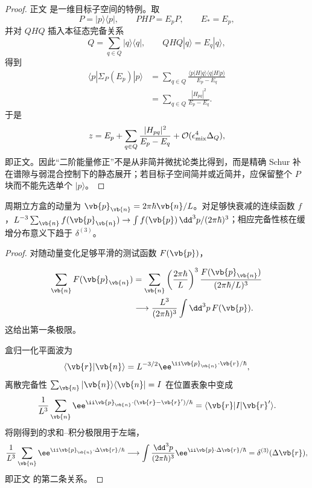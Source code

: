 \begin{proof}
正文 是一维目标子空间的特例。取
\[
P=|p\rangle\langle p|,
\qquad
PHP=E_pP,
\qquad
E_*=E_p,
\]
并对 \(QHQ\) 插入本征态完备关系
\[
Q
=
\sum_{q\in Q}|q\rangle\langle q|,
\qquad
QHQ|q\rangle=E_q|q\rangle,
\]
得到
\begin{align*}
\langle p|\Sigma_P(E_p)|p\rangle
&=
\sum_{q\in Q}
\frac{
\langle p|H|q\rangle
\langle q|H|p\rangle
}{E_p-E_q}\\
&=
\sum_{q\in Q}
\frac{|H_{pq}|^2}{E_p-E_q}.
\end{align*}
于是
\[
z
=
E_p
+
\sum_{q\in Q}
\frac{|H_{pq}|^2}{E_p-E_q}
+
\mathcal O(\epsilon_{\rm mix}^4\Delta_Q),
\]
即正文。因此“二阶能量修正”不是从非简并微扰论类比得到，而是精确 Schur 补在谱隙与弱混合控制下的静态展开；若目标子空间简并或近简并，应保留整个 \(P\) 块而不能先选单个 \(|p\rangle\)。
\end{proof}

\begin{proposition}[盒归一化的连续谱极限]
周期立方盒的动量为 $\vb{p}_{\vb{n}}=2\pi\hbar\vb{n}/L$。对足够快衰减的连续函数 $f$，$L^{-3}\sum_{\vb{n}}f(\vb{p}_{\vb{n}})\to\int f(\vb{p})\,\dd^3p/(2\pi\hbar)^3$；相应完备性核在缓增分布意义下趋于 $\delta^{(3)}$。
\end{proposition}
\begin{proof}
对随动量变化足够平滑的测试函数 $F(\vb{p})$，

\begin{align*}
 \sum_{\vb{n}}F(\vb{p}_{\vb{n}})
 &=\sum_{\vb{n}}
 \left(\frac{2\pi\hbar}{L}\right)^3
 \frac{F(\vb{p}_{\vb{n}})}{(2\pi\hbar/L)^3}\\
 &\longrightarrow
 \frac{L^3}{(2\pi\hbar)^3}
 \int\dd^3 p\,F(\vb{p}).
\end{align*}
这给出第一条极限。

盒归一化平面波为
\begin{equation*}
 \langle\vb{r}|\vb{n}\rangle
 =L^{-3/2}\ee^{\ii\vb{p}_{\vb{n}}\cdot\vb{r}/\hbar},
\end{equation*}
离散完备性
$\sum_{\vb{n}}|\vb{n}\rangle\langle\vb{n}|=I$
在位置表象中变成
\begin{equation*}
 \frac1{L^3}\sum_{\vb{n}}
 \ee^{\ii\vb{p}_{\vb{n}}\cdot(\vb{r}-\vb{r}')/\hbar}
 =\langle\vb{r}|I|\vb{r}'\rangle.
\end{equation*}
将刚得到的求和--积分极限用于左端，
\begin{equation*}
 \frac1{L^3}\sum_{\vb{n}}
 \ee^{\ii\vb{p}_{\vb{n}}\cdot\Delta\vb{r}/\hbar}
 \longrightarrow
 \int\frac{\dd^3 p}{(2\pi\hbar)^3}
 \ee^{\ii\vb{p}\cdot\Delta\vb{r}/\hbar}
 =\delta^{(3)}(\Delta\vb{r}),
\end{equation*}
即正文 的第二条关系。
\end{proof}

